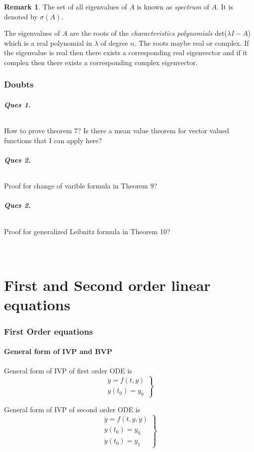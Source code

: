 \documentclass[12pt,reqno]{amsart}
\theoremstyle{plain}
\theoremstyle{definition}
\newtheorem{rem}{Remark}
\begin{document}
\begin{rem}
    The set of all eigenvalues of $A$ is known as {\it spectrum} of $A$. It is denoted by $\sigma(A)$.
\end{rem}
The eigenvalues of $A$ are the roots of the {\it characteristics polynomials} det($\lambda I - A$) which is a real polynomial in $\lambda$ of degree $n$. The roots maybe real or complex. If the eigenvalue is real then there exists a corresponding real eigenvector and if it complex then there exists a corresponding complex eigenvector.

\section{Doubts}
\paragraph{\bf Ques 1.} How to prove theorem 7? Is there a mean value theorem for vector valued functions that I can apply here?
\paragraph{\bf Ques 2.} Proof for change of varible formula in Theorem 9?
\paragraph{\bf Ques 2.} Proof for generalized Leibnitz formula in Theorem 10?

\newpage
{\large \part{\centering \\ First and Second order linear equations}}
\section{First Order equations}
\subsection{General form of IVP and BVP}
General form of IVP of first order ODE is
$$ 
\left.
\begin{array}{l}    %
    \dot{y} = f(t, y) \\ y(t_0) = y_0
\end{array}
\right\}
$$

General form of IVP of second order ODE is
$$
\left.
\begin{array}{l}
    \ddot{y} = f(t, y, \dot{y}) \\ y(t_0) = y_0 \\ \dot{y}(t_0) = y_1
\end{array}
\right\}
$$
\end{document}
